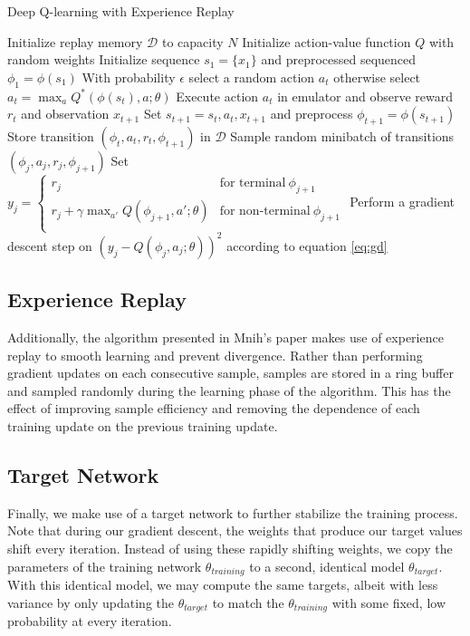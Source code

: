 \documentclass{article}
\begin{document}
\begin{algorithm}
\caption{Deep Q-learning with Experience Replay}
\label{alg:dqn}
\begin{algorithmic}[1]
\State Initialize replay memory $\mathcal{D}$ to capacity $N$
\State Initialize action-value function $Q$ with random weights
    \State Initialize sequence $s_1 = \{x_1\}$ and preprocessed sequenced $\phi_1 = \phi(s_1)$
        \State With probability $\epsilon$ select a random action $a_t$
        \State otherwise select $a_t = \max_{a}Q^{*}(\phi(s_t), a; \theta)$
        \State Execute action $a_t$ in emulator and observe reward $r_t$ and observation $x_{t + 1}$
        \State Set $s_{t + 1} = s_t, a_t, x_{t + 1}$ and preprocess $\phi_{t + 1} = \phi(s_{t + 1})$
        \State Store transition $(\phi_t, a_t, r_t, \phi_{t + 1})$ in $\mathcal{D}$
        \State Sample random minibatch of transitions $(\phi_j, a_j, r_j, \phi_{j + 1})$
        \State Set $ \displaystyle  y_j = 
                        \begin{cases}
                            r_j & \textrm{for terminal}\ \phi_{j + 1} \\
                            r_j + \gamma\max_{a'}Q(\phi_{j + 1}, a'; \theta) & \textrm{for non-terminal}\ \phi_{j + 1} \\
                        \end{cases}
                   $
        \State Perform a gradient descent step on $(y_j - Q(\phi_j, a_j; \theta))^2$ according to equation \ref{eq:gd}
    \EndFor
\EndFor
\end{algorithmic}
\end{algorithm}

\subsection{Experience Replay}
Additionally, the algorithm presented in Mnih's paper makes use of experience replay to smooth learning and prevent divergence.
Rather than performing gradient updates on each consecutive sample, samples are stored in a ring buffer and sampled randomly during the learning phase of the algorithm. 
This has the effect of improving sample efficiency and removing the dependence of each training update on the previous training update.

\subsection{Target Network}
Finally, we make use of a target network to further stabilize the training process. 
Note that during our gradient descent, the weights that produce our target values shift every iteration.
Instead of using these rapidly shifting weights, we copy the parameters of the training network $\theta_{training}$ to a second, identical model $\theta_{target}$.
With this identical model, we may compute the same targets, albeit with less variance by only updating the $\theta_{target}$ to match the $\theta_{training}$ with some fixed, low probability at every iteration.
\end{document}
